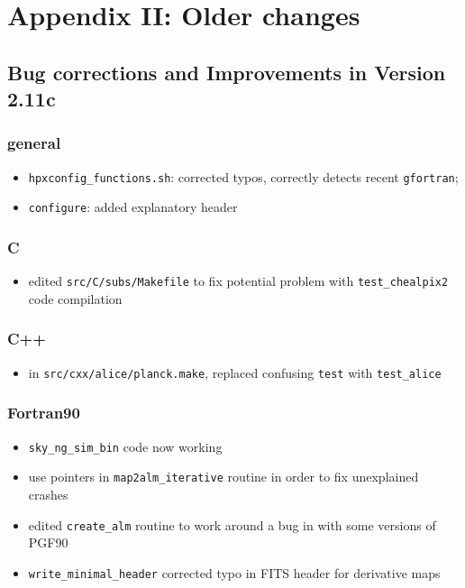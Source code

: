 \documentclass[12pt,twoside]{article}
\begin{document}
{\footnotesize{%
\section{Appendix II: Older changes}
\subsection{Bug corrections and Improvements in Version 2.11c}
%
\subsubsection[New General Improvements]{general}
\begin{itemize}
	\item {\tt hpxconfig\_functions.sh}: corrected typos,
correctly detects recent {\tt gfortran}; 
	\item {\tt configure}: added explanatory header
\end{itemize}

\subsubsection[C]{C}	
	\begin{itemize}
	\item edited {\tt src/C/subs/Makefile} to fix potential problem with
{\tt test\_chealpix2} code compilation
	\end{itemize}

\subsubsection[C++]{C++}
	\begin{itemize}
	\item in {\tt src/cxx/alice/planck.make}, replaced confusing {\tt test} with {\tt test\_alice}
	\end{itemize}

\subsubsection[Fortran90]{Fortran90}
	\begin{itemize}
	\item {\tt sky\_ng\_sim\_bin} code now working
	\item  use pointers in {\tt map2alm\_iterative} routine in order to fix unexplained crashes
	\item edited {\tt create\_alm} routine to work around a bug in with some versions of PGF90
	\item {\tt write\_minimal\_header} corrected typo in FITS header for derivative maps
	\end{itemize}

}}
\end{document}
